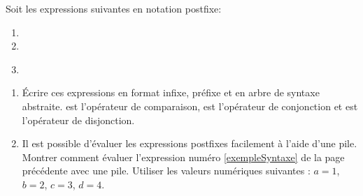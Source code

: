 \begin{Exercise}
\label{ex:postfixe}
Soit les expressions suivantes en notation postfixe:
\begin{enumerate}
\item {}
\item {}
\item \label{exempleSyntaxe}
\end{enumerate}

\begin{enumerate}
\item Écrire ces expressions en format infixe, préfixe et en arbre de
  syntaxe abstraite. \codeinline{==} est l'opérateur de comparaison,
  \codeinline{&&} est l'opérateur de conjonction et \codeinline{||}
  est l'opérateur de disjonction.


\item
Il est possible d'évaluer les expressions postfixes facilement à
l'aide d'une pile. Montrer comment évaluer l'expression numéro
\ref{exempleSyntaxe} de la page précédente avec une pile. Utiliser les
valeurs numériques suivantes : $a = 1$, $b = 2$, $c = 3$, $d = 4$.
\end{enumerate}
\end{Exercise}


